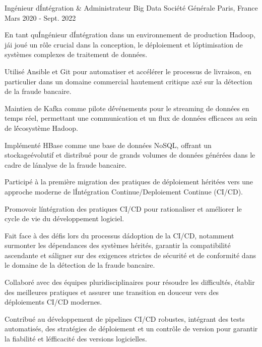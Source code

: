 \begin{cventries}
  \cventry
    {Ingénieur d\' Intégration \& Administrateur Big Data} %
    {Société Générale} %
    {Paris, France} %
    {Mars 2020 - Sept. 2022} %
    {
      \begin{cvitems} %
        \item {En tant qu\' Ingénieur d\' Intégration dans un environnement de production Hadoop, j\' ai joué un rôle crucial dans la conception, le déploiement et l\' optimisation de systèmes complexes de traitement de données.}
        \item {Utilisé Ansible et Git pour automatiser et accélérer le processus de livraison, en particulier dans un domaine commercial hautement critique axé sur la détection de la fraude bancaire.}
        \item {Maintien de Kafka comme pilote d\' événements pour le streaming de données en temps réel, permettant une communication et un flux de données efficaces au sein de l\' écosystème Hadoop.}
        \item {Implémenté HBase comme une base de données NoSQL, offrant un stockageévolutif et distribué pour de grands volumes de données générées dans le cadre de l\' analyse de la fraude bancaire.}
        \item {Participé à la première migration des pratiques de déploiement héritées vers une approche moderne de l\' Intégration Continue/Deploiement Continue (CI/CD).}
        \item {Promovoir l\' intégration des pratiques CI/CD pour rationaliser et améliorer le cycle de vie du développement logiciel.}
        \item {Fait face à des défis lors du processus d\' adoption de la CI/CD, notamment surmonter les dépendances des systèmes hérités, garantir la compatibilité ascendante et s\' aligner sur des exigences strictes de sécurité et de conformité dans le domaine de la détection de la fraude bancaire.}
        \item {Collaboré avec des équipes pluridisciplinaires pour résoudre les difficultés, établir des meilleures pratiques et assurer une transition en douceur vers des déploiements CI/CD modernes.}
        \item {Contribué au développement de pipelines CI/CD robustes, intégrant des tests automatisés, des stratégies de déploiement et un contrôle de version pour garantir la fiabilité et l\' efficacité des versions logicielles.}
      \end{cvitems}
      
}
\end{cventries}
